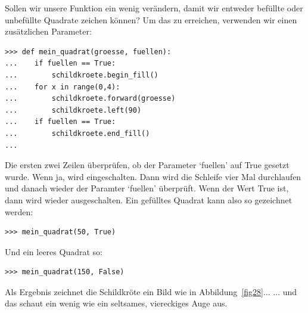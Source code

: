 Sollen wir unsere Funktion ein wenig verändern, damit wir entweder befüllte oder unbefüllte Quadrate zeichen können? Um das zu erreichen, verwenden wir einen zusätzlichen Parameter:

\begin{Verbatim}[frame=single]
>>> def mein_quadrat(groesse, fuellen):
...    if fuellen == True:
...        schildkroete.begin_fill()
...    for x in range(0,4):
...        schildkroete.forward(groesse)
...        schildkroete.left(90)
...    if fuellen == True:
...        schildkroete.end_fill()
...
\end{Verbatim}

Die ersten zwei Zeilen überprüfen, ob der Parameter `fuellen' auf True gesetzt wurde. Wenn ja, wird  eingeschalten. Dann wird die Schleife vier Mal durchlaufen und danach wieder der Paramter `fuellen' überprüft. Wenn der Wert True ist, dann wird  wieder ausgeschalten. Ein gefülltes Quadrat kann also so gezeichnet werden:

\begin{Verbatim}[frame=single]
>>> mein_quadrat(50, True)
\end{Verbatim}

\noindent
Und ein leeres Quadrat so:

\begin{Verbatim}[frame=single]
>>> mein_quadrat(150, False)
\end{Verbatim}

\noindent
Als Ergebnis zeichnet die Schildkröte ein Bild wie in Abbildung~\ref{fig28}\texorpdfstring{$\ldots$}{...} \texorpdfstring{$\ldots$}{...} und das schaut ein wenig wie ein seltsames, viereckiges Auge aus.

